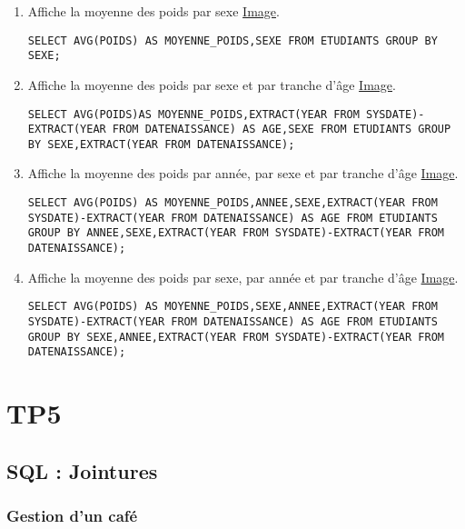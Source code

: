 \documentclass{report}
\begin{document}
\begin{enumerate}
	\item Affiche la moyenne des poids par sexe \href{run:./Images/TP4/tp4_18.png}{Image}.
	\begin{lstlisting}
SELECT AVG(POIDS) AS MOYENNE_POIDS,SEXE FROM ETUDIANTS GROUP BY SEXE;
	\end{lstlisting}
	\item Affiche la moyenne des poids par sexe et par tranche d'âge \href{run:./Images/TP4/tp4_19.png}{Image}.
	\begin{lstlisting}
SELECT AVG(POIDS)AS MOYENNE_POIDS,EXTRACT(YEAR FROM SYSDATE)-EXTRACT(YEAR FROM DATENAISSANCE) AS AGE,SEXE FROM ETUDIANTS GROUP BY SEXE,EXTRACT(YEAR FROM DATENAISSANCE);	
	\end{lstlisting}
	\item Affiche la moyenne des poids par année, par sexe et par tranche d'âge \href{run:./Images/TP4/tp4_20.png}{Image}.
	\begin{lstlisting}
SELECT AVG(POIDS) AS MOYENNE_POIDS,ANNEE,SEXE,EXTRACT(YEAR FROM SYSDATE)-EXTRACT(YEAR FROM DATENAISSANCE) AS AGE FROM ETUDIANTS GROUP BY ANNEE,SEXE,EXTRACT(YEAR FROM SYSDATE)-EXTRACT(YEAR FROM DATENAISSANCE);
	\end{lstlisting}
	\item Affiche la moyenne des poids par sexe, par année et par tranche d'âge \href{run:./Images/TP4/tp4_21.png}{Image}.
	\begin{lstlisting}
SELECT AVG(POIDS) AS MOYENNE_POIDS,SEXE,ANNEE,EXTRACT(YEAR FROM SYSDATE)-EXTRACT(YEAR FROM DATENAISSANCE) AS AGE FROM ETUDIANTS GROUP BY SEXE,ANNEE,EXTRACT(YEAR FROM SYSDATE)-EXTRACT(YEAR FROM DATENAISSANCE);
	\end{lstlisting}
\end{enumerate}

  
\chapter{TP5}

\section{SQL : Jointures}

\subsection{Gestion d'un café}
\end{document}
